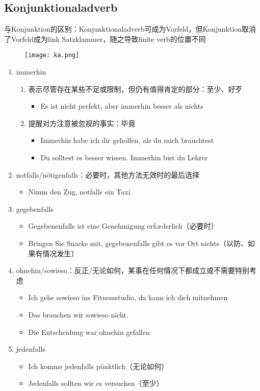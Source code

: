 \documentclass[UTF8]{report}
\begin{document}
\subsection{Konjunktionaladverb}
与Konjunktion的区别：Konjunktionaladverb可成为Vorfeld，但Konjunktion取消了Vorfeld成为link Satzklammer，随之导致finite verb的位置不同
\begin{figure}[H]
    \centering
    \texttt{[image: ka.png]}
\end{figure}

\begin{enumerate}
    \item immerhin
    \begin{enumerate}
        \item 表示尽管存在某些不足或限制，但仍有值得肯定的部分：至少、好歹
        \begin{itemize}
            \item Es ist nicht perfekt, aber immerhin besser als nichts
        \end{itemize}
        \item 提醒对方注意被忽视的事实：毕竟
        \begin{itemize}
            \item Immerhin habe ich dir geholfen, als du mich brauchtest
            \item Du solltest es besser wissen. Immerhin bist du Lehrer
        \end{itemize}
    \end{enumerate}
    \item notfalls/nötigenfalls：必要时，其他方法无效时的最后选择
    \begin{itemize}
        \item Nimm den Zug, notfalls ein Taxi
    \end{itemize}
    \item gegebenfalls
    \begin{itemize}
        \item Gegebenenfalls ist eine Genehmigung erforderlich（必要时）
        \item Bringen Sie Snacks mit, gegebenenfalls gibt es vor Ort nichts（以防、如果有情况发生）
    \end{itemize}
    \item ohnehin/sowieso：反正/无论如何，某事在任何情况下都成立或不需要特别考虑
    \begin{itemize}
        \item Ich gehe sowieso ins Fitnessstudio, da kann ich dich mitnehmen
        \item Das brauchen wir sowieso nicht.
        \item Die Entscheidung war ohnehin gefallen
    \end{itemize}
    \item jedenfalls
    \begin{itemize}
        \item Ich komme jedenfalls pünktlich（无论如何）
        \item Jedenfalls sollten wir es versuchen（至少）
    \end{itemize}
\end{enumerate}
\end{document}
